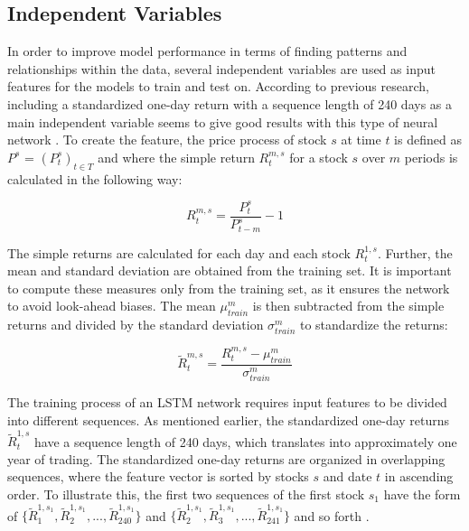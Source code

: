 \subsection{Independent Variables}
In order to improve model performance in terms of finding patterns and relationships within the data, several independent variables are used as input features for the models to train and test on. According to previous research, including a standardized one-day return with a sequence length of 240 days as a main independent variable seems to give good results with this type of neural network \cite{krauss}. To create the feature, the price process of stock $\textit{s}$ at time $\textit{t}$ is defined as $P^{s}$ = $(P^{s}_{t})_{t\in T}$ and where the simple return $R^{m,s}_{t}$ for a stock $\textit{s}$ over $\textit{m}$ periods is calculated in the following way:

\indent\newline
\begin{equation}
R^{m,s}_{t} = \frac{P^{s}_{t}}{P^{s}_{t-m}} - 1
\end{equation}

\indent\newline
The simple returns are calculated for each day and each stock $R^{1,s}_{t}$. Further, the mean and standard deviation are obtained from the training set. It is important to compute these measures only from the training set, as it ensures the network to avoid look-ahead biases. The mean $\mu^m_{train}$ is then subtracted from the simple returns and divided by the standard deviation $\sigma^{m}_{train}$ to standardize the returns:

\indent\newline
\begin{equation}
\tilde{R}^{m,s}_{t} = \frac{R^{m,s}_{t} - \mu^m_{train}}{\sigma^{m}_{train}}
\end{equation}

\indent\newline
The training process of an LSTM network requires input features to be divided into different sequences. As mentioned earlier, the standardized one-day returns $\tilde{R}^{1,s}_{t}$ have a sequence length of 240 days, which translates into approximately one year of trading. The standardized one-day returns are organized in overlapping sequences, where the feature vector is sorted by stocks $\textit{s}$ and date $\textit{t}$ in ascending order. To illustrate this, the first two sequences of the first stock $s_{1}$ have the form of $\lbrace\tilde{R}^{1,s_{1}}_{1}, \tilde{R}^{1,s_{1}}_{2}, ..., \tilde{R}^{1,s_{1}}_{240}\rbrace$ and $\lbrace\tilde{R}^{1,s_{1}}_{2}, \tilde{R}^{1,s_{1}}_{3}, ..., \tilde{R}^{1,s_{1}}_{241}\rbrace$ and so forth \cite{krauss}. 
   
